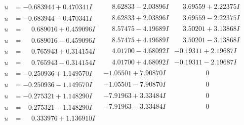\documentclass[1p]{elsarticle_modified}
\theoremstyle{definition}
\begin{document}
$$\begin{array}{c|c|c}
 \hline 
\begin{aligned}
u &= -0.683944 + 0.470341 I\end{aligned}
 & \phantom{-}8.62833 - 2.03896 I & \phantom{-}3.69559 + 2.22375 I \\ \hline\begin{aligned}
u &= -0.683944 - 0.470341 I\end{aligned}
 & \phantom{-}8.62833 + 2.03896 I & \phantom{-}3.69559 - 2.22375 I \\ \hline\begin{aligned}
u &= \phantom{-}0.689016 + 0.459096 I\end{aligned}
 & \phantom{-}8.57475 - 4.19689 I & \phantom{-}3.50201 + 3.13868 I \\ \hline\begin{aligned}
u &= \phantom{-}0.689016 - 0.459096 I\end{aligned}
 & \phantom{-}8.57475 + 4.19689 I & \phantom{-}3.50201 - 3.13868 I \\ \hline\begin{aligned}
u &= \phantom{-}0.765943 + 0.314154 I\end{aligned}
 & \phantom{-}4.01700 - 4.68092 I & -0.19311 + 2.19687 I \\ \hline\begin{aligned}
u &= \phantom{-}0.765943 - 0.314154 I\end{aligned}
 & \phantom{-}4.01700 + 4.68092 I & -0.19311 - 2.19687 I \\ \hline\begin{aligned}
u &= -0.250936 + 1.149570 I\end{aligned}
 & -1.05501 + 7.90870 I & \phantom{-0.000000 } 0 \\ \hline\begin{aligned}
u &= -0.250936 - 1.149570 I\end{aligned}
 & -1.05501 - 7.90870 I & \phantom{-0.000000 } 0 \\ \hline\begin{aligned}
u &= -0.275321 + 1.148290 I\end{aligned}
 & -7.91963 + 3.33484 I & \phantom{-0.000000 } 0 \\ \hline\begin{aligned}
u &= -0.275321 - 1.148290 I\end{aligned}
 & -7.91963 - 3.33484 I & \phantom{-0.000000 } 0 \\ \hline\begin{aligned}
u &= \phantom{-}0.333976 + 1.136910 I\end{aligned}

\end{array}$$
\end{document}
